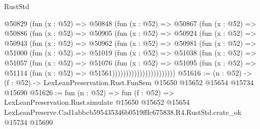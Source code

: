 \begin{lexlean}{RustStd}
\begin{coremodule}
                @50829
                  (fun (x : @52) =>
                  @50848
                    (fun (x : @52) =>
                    @50867
                      (fun (x : @52) =>
                      @50886
                        (fun (x : @52) =>
                        @50905
                          (fun (x : @52) =>
                          @50924
                            (fun (x : @52) =>
                            @50943
                              (fun (x : @52) =>
                              @50962
                                (fun (x : @52) =>
                                @50981
                                  (fun (x : @52) =>
                                  @51000
                                    (fun (x : @52) =>
                                    @51019
                                      (fun (x : @52) =>
                                      @51038
                                        (fun (x : @52) =>
                                        @51057
                                          (fun (x : @52) =>
                                          @51076
                                            (fun (x : @52) =>
                                            @51095
                                              (fun (x : @52) =>
                                              @51114 (fun (x : @52) => @51561)))))))))))))))))))))))
@51616 := (n : @52) ->
  (f : @52) -> LexLeanPreservation.Rust.FunSem @15650 @15652 @15654 @15734 @15690
@51626 := fun (n : @52) =>
  fun (f : @52) =>
  LexLeanPreservation.Rust.simulate
    @15650
    @15652
    @15654
    LexLeanPreserve.Cad1abbcb595435346b0519fffc675838.R4.RustStd.crate_ok
    @15734
    @15690
\end{coremodule}
\end{lexlean}
